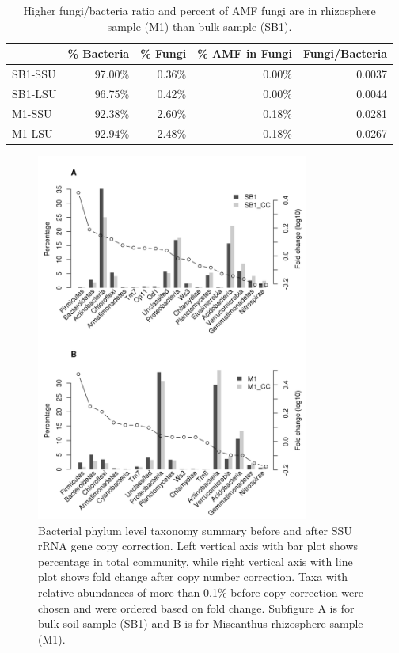 \documentclass[]{msu-thesis}
\begin{document}
\begin{table}[htbp]
  \centering
  \caption[Fungi/bacteria ratio and percent of AMF fungi in rhizosphere and bulk soil samples]{Higher fungi/bacteria ratio and percent of AMF fungi are in rhizosphere sample (M1) than bulk sample (SB1).}
    \begin{tabular}{|l|r|r|r|r|}
    \toprule
          & \multicolumn{1}{l|}{\% Bacteria} & \multicolumn{1}{l|}{\% Fungi} & \multicolumn{1}{l|}{\% AMF in Fungi} & \multicolumn{1}{l|}{Fungi/Bacteria} \\
    \midrule
    SB1-SSU & 97.00\% & 0.36\% & 0.00\% & 0.0037 \\
    \midrule
    SB1-LSU & 96.75\% & 0.42\% & 0.00\% & 0.0044 \\
    \midrule
    M1-SSU & 92.38\% & 2.60\% & 0.18\% & 0.0281 \\
    \midrule
    M1-LSU & 92.94\% & 2.48\% & 0.18\% & 0.0267 \\
    \bottomrule
    \end{tabular}%
  \label{tab:chap2TabS1}%
\end{table}%


\begin{figure}[tbph!]
  \centering
  \includegraphics[width=0.80\textwidth]{figs/chap2_figS8}
  \caption[Bacterial phylum level taxonomy summary before and after SSU rRNA gene copy correction]{Bacterial phylum level taxonomy summary before and after SSU rRNA gene copy correction. Left vertical axis with bar plot shows percentage in total community, while right vertical axis with line plot shows fold change after copy number correction. Taxa with relative abundances of more than 0.1\% before copy correction were chosen and were ordered based on fold change. Subfigure A is for bulk soil sample (SB1) and B is for Miscanthus rhizosphere sample (M1).}
  \label{fig:chap2FigS8}
\end{figure}
\end{document}
